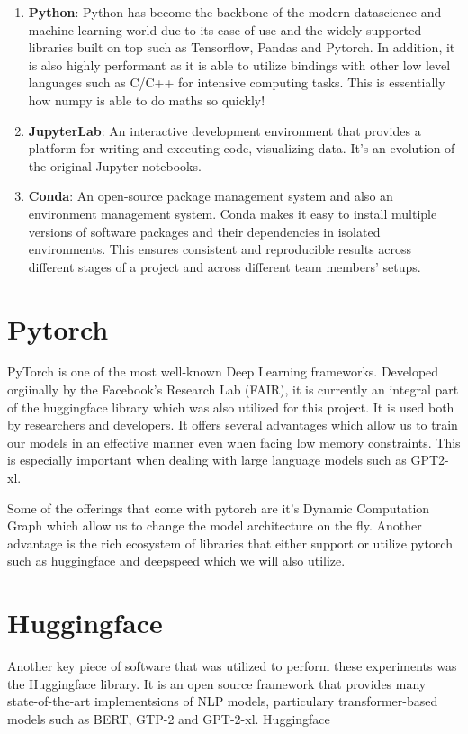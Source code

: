 \documentclass[\main/thesis.tex]{subfiles}
\begin{document}
\begin{enumerate}
    \item \textbf{Python}: Python has become the backbone of the modern datascience and machine learning 
    world due to its ease of use and the widely supported libraries built on top such as Tensorflow, Pandas and Pytorch. 
    In addition, it is also highly performant as it is able to utilize bindings with other low level languages
    such as C/C++ for intensive computing tasks. This is essentially how numpy is able to do maths so quickly! 
    
    \item \textbf{JupyterLab}: An interactive development environment that provides a platform for writing 
    and executing code, visualizing data. It's an evolution of the original Jupyter notebooks. 
    
    \item \textbf{Conda}: An open-source package management system and also an environment 
    management system. Conda makes it easy to install multiple versions of software packages 
    and their dependencies in isolated environments. This ensures consistent and reproducible 
    results across different stages of a project and across different team members' setups.
\end{enumerate}


\section{Pytorch}\label{sec:pytorch}
PyTorch\cite{paszke_pytorch_2019} is one of the most well-known Deep Learning frameworks. Developed orgiinally by the Facebook's Research Lab (FAIR), 
it is currently an integral part of the huggingface library which was also utilized for this project. It is used both by
researchers and developers. It offers several advantages which allow us to train our models in an effective manner even when 
facing low memory constraints. This is especially important when dealing with large language models such as GPT2-xl. 

Some of the offerings that come with pytorch are it's Dynamic Computation Graph which allow us to change the model architecture 
on the fly. Another advantage is the rich ecosystem of libraries that either support or utilize pytorch such as 
huggingface and deepspeed which we will also utilize. 

\section{Huggingface}\label{sec:huggingface}
Another key piece of software that was utilized to perform these experiments was the Huggingface\cite{wolf_transformers_2020} library. It is 
an open source framework that provides many state-of-the-art implementsions of NLP models, particulary transformer-based models such as BERT, GTP-2 
and GPT-2-xl. Huggingface 
\end{document}
